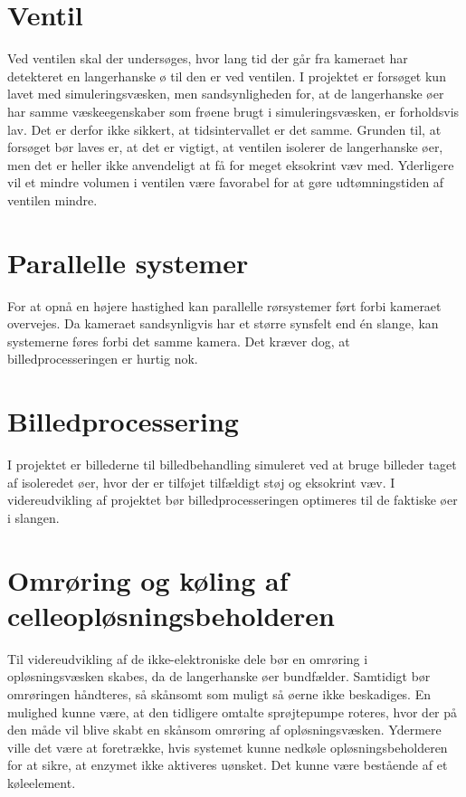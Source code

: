 \section{Ventil}
Ved ventilen skal der undersøges, hvor lang tid der går fra kameraet har detekteret en langerhanske ø til den er ved ventilen. I projektet er forsøget kun lavet med simuleringsvæsken, men sandsynligheden for, at de langerhanske øer har samme væskeegenskaber som frøene brugt i simuleringsvæsken, er forholdsvis lav. Det er derfor ikke sikkert, at tidsintervallet er det samme. Grunden til, at forsøget bør laves er, at det er vigtigt, at ventilen isolerer de langerhanske øer, men det er heller ikke anvendeligt at få for meget eksokrint væv med. Yderligere vil et mindre volumen i ventilen være favorabel for at gøre udtømningstiden af ventilen mindre.   

\section{Parallelle systemer}
For at opnå en højere hastighed kan parallelle rørsystemer ført forbi kameraet overvejes.
Da kameraet sandsynligvis har et større synsfelt end én slange, kan systemerne føres forbi det samme kamera. Det kræver dog, at billedprocesseringen er hurtig nok.

\section{Billedprocessering}
I projektet er billederne til billedbehandling simuleret ved at bruge billeder taget af isoleredet øer, hvor der er tilføjet tilfældigt støj og eksokrint væv. I videreudvikling af projektet bør billedprocesseringen optimeres til de faktiske øer i slangen.

\section{Omrøring og køling af celleopløsningsbeholderen}
Til videreudvikling af de ikke-elektroniske dele bør en omrøring i opløsningsvæsken skabes, da de langerhanske øer bundfælder. Samtidigt bør omrøringen håndteres, så skånsomt som muligt så øerne ikke beskadiges. En mulighed kunne være, at den tidligere omtalte sprøjtepumpe roteres, hvor der på den måde vil blive skabt en skånsom omrøring af opløsningsvæsken. Ydermere ville det være at foretrække, hvis systemet kunne nedkøle opløsningsbeholderen for at sikre, at enzymet ikke aktiveres uønsket. Det kunne være bestående af et køleelement. 

